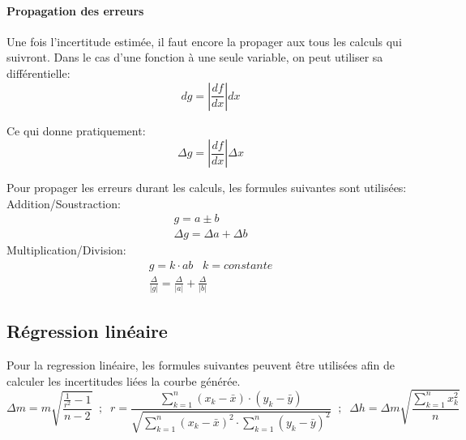 \paragraph{Propagation des erreurs}
Une fois l'incertitude estimée, il faut encore la propager aux tous les calculs qui suivront. Dans le cas d'une fonction à une seule variable, on peut utiliser sa différentielle:
\begin{equation}
    dg=|{\frac{df}{dx}}|dx
\end{equation}

Ce qui donne pratiquement:
\begin{equation}
    \Delta g=|\frac{df}{dx}|\Delta x
\end{equation}

Pour propager les erreurs durant les calculs, les formules suivantes sont utilisées:\\
Addition/Soustraction:
\begin{equation}
    \begin{split}
	g = a \pm b\\
	\Delta g = \Delta a + \Delta b
    \end{split}
\end{equation}
Multiplication/Division:
\begin{equation}
    \begin{split}
	g = k\cdot ab \;\;\; k=constante\\
	\frac{\Delta}{|g|} = \frac{\Delta}{|a|} + \frac{\Delta}{|b|}
    \end{split}
\end{equation}

\subsection{Régression linéaire}

Pour la regression linéaire, les formules suivantes peuvent être utilisées afin de calculer les incertitudes liées la courbe générée.
\begin{equation}
    \Delta m=m\sqrt{\frac{\frac{1}{r^2}-1}{n-2}} \;\;;\;\;
    r=\frac{\sum_{k=1}^{n}(x_k-\bar{x})\cdot(y_k-\bar{y})}{\sqrt{\sum_{k=1}^{n}(x_k-\bar{x})^2\cdot\sum_{k=1}^{n}(y_k-\bar{y})^2}} \;\;;\;\;
    \Delta h=\Delta m \sqrt{\frac{\sum_{k=1}^{n}x_k^2}{n}}
\end{equation}

